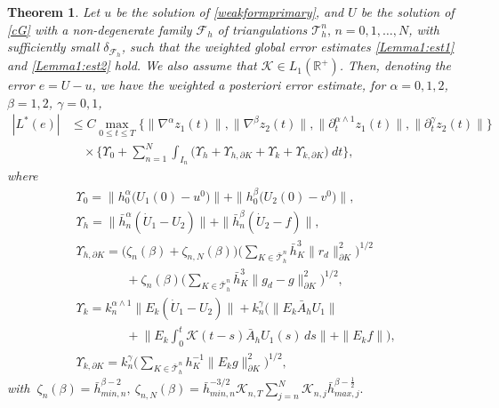 \documentclass{amsart}
\numberwithin{equation}{section}
\newtheorem{theorem}{Theorem}
\theoremstyle{definition}
\begin{document}
\begin{theorem}
Let $u$ be the solution of \eqref{weakformprimary}, and $U$ be the
solution of \eqref{cG} with a non-degenerate family ${\mathcal F}_h$
of triangulations ${\mathcal T}_h^n,\,n=0,1,\dots,N$, with sufficiently
small $\delta_{{\mathcal F}_h}$, such that the weighted global error
estimates \eqref{Lemma1:est1} and \eqref{Lemma1:est2} hold. 
We also assume that ${\mathcal K} \in L_1(\mathbb{R}^+)$. 
Then, denoting the error $e=U-u$, 
we have the weighted a posteriori error estimate, 
for $\alpha=0,1,2$, $\beta=1,2$, $\gamma=0,1$, 
\begin{equation}   \label{aposteriori:estimate}
  \begin{split}
    |L^*(e)|
    &\le C \max_{0 \leq t\leq T}
     \Big\{\|\nabla^\alpha z_1(t)\| , \|\nabla^\beta z_2(t)\| 
      , \| \partial^{\alpha \wedge 1}_t z_1(t)\| 
      ,\| \partial^\gamma_t z_2(t)\|  
     \Big\} \\
     &\quad \times \Big\{
     \Upsilon_0 + \sum_{n=1}^N \int_{I_n} 
     \Big(\Upsilon_{h}+\Upsilon_{h,\partial K}
       +\Upsilon_k + \Upsilon_{k,\partial K}     
     \Big) \ dt \Big\},
  \end{split}
\end{equation}
where
\begin{equation*}   
  \begin{split}
    &\Upsilon_0 
     =\| h_0^\alpha \big(U_1(0)-u^0\big)\|
       +\| h_0^\beta\big(U_2(0)-v^0\big)\|,\\
    &\Upsilon_{h}
     =\| \bar h_n^\alpha(\dot U_1-U_2)\|+\| \bar h_n^\beta(\dot U_2-f)\|,\\
    &\Upsilon_{h,\partial K}
     =\big(\zeta_{n}(\beta)+\zeta_{n,N}(\beta)\big)
    \Big(\sum_{K\in\bar{\mathcal T}_h^n}\bar h_{K}^3
       \|r_d\|_{\partial K}^2\Big)^{1/2}\\
    &\qquad\qquad
     +\zeta_{n}(\beta)
      \Big(\sum_{K\in\bar{\mathcal T}_h^n}\bar h_{K}^3
      \|g_d-g\|_{\partial K}^2\Big)^{1/2},\\
    &\Upsilon_{k}
     =k_n^{\alpha \wedge 1}\|E_k(\dot U_1-U_2)\| 
     +k_n^\gamma \Big(\|E_k\bar A_hU_1\|\\
    &\qquad\qquad 
     +\big\|E_k\int_0^t\!\!
      {\mathcal K}(t-s)\bar A_hU_1(s)\,ds\big\| +\|E_kf\| \Big),\\
    &\Upsilon_{k,\partial K}
     =k_n^\gamma\Big(\sum_{K\in \bar {\mathcal T}_h^n}
        h_K^{-1}\|E_kg\|_{\partial K}^2\Big)^{1/2},
  \end{split}
\end{equation*}
with 
$\ \zeta_n(\beta)=\bar h_{min,n}^{\beta-2}, \ 
\zeta_{n,N}(\beta)=\bar h_{min,n}^{-3/2}  {\mathcal K}_{n,T}
\sum_{j=n}^N {\mathcal K}_{n,j} \bar h_{max,j}^{\beta-\frac{1}{2}}.$
\end{theorem}
\end{document}

